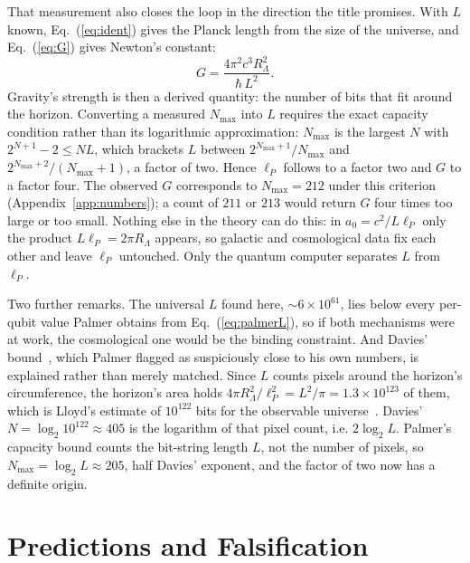 \documentclass[aps,prd,twocolumn,superscriptaddress,nofootinbib,showkeys]{revtex4-2}
\begin{document}
That measurement also closes the loop in the direction the title promises. With $L$ known, Eq.~(\ref{eq:ident}) gives the Planck length from the size of the universe, and Eq.~(\ref{eq:G}) gives Newton's constant:
\begin{equation}
G = \frac{4\pi^2 c^3 R_\Lambda^2}{\hbar\,L^2}.
\label{eq:Gchain}
\end{equation}
Gravity's strength is then a derived quantity: the number of bits that fit around the horizon. Converting a measured $N_{\max}$ into $L$ requires the exact capacity condition rather than its logarithmic approximation: $N_{\max}$ is the largest $N$ with $2^{N+1}-2\le NL$, which brackets $L$ between $2^{N_{\max}+1}/N_{\max}$ and $2^{N_{\max}+2}/(N_{\max}+1)$, a factor of two. Hence $\ell_P$ follows to a factor two and $G$ to a factor four. The observed $G$ corresponds to $N_{\max}=212$ under this criterion (Appendix~\ref{app:numbers}); a count of $211$ or $213$ would return $G$ four times too large or too small. Nothing else in the theory can do this: in $a_0 = c^2/L\ell_P$ only the product $L\ell_P = 2\pi R_\Lambda$ appears, so galactic and cosmological data fix each other and leave $\ell_P$ untouched. Only the quantum computer separates $L$ from $\ell_P$.

Two further remarks. The universal $L$ found here, $\sim6\times10^{61}$, lies below every per-qubit value Palmer obtains from Eq.~(\ref{eq:palmerL}), so if both mechanisms were at work, the cosmological one would be the binding constraint. And Davies' bound~\cite{davies2007}, which Palmer flagged as suspiciously close to his own numbers, is explained rather than merely matched. Since $L$ counts pixels around the horizon's circumference, the horizon's area holds $4\pi R_\Lambda^2/\ell_P^2 = L^2/\pi = 1.3\times10^{123}$ of them, which is Lloyd's estimate of $10^{122}$ bits for the observable universe~\cite{lloyd2002}. Davies' $N = \log_2 10^{122}\approx405$ is the logarithm of that pixel count, i.e. $2\log_2L$. Palmer's capacity bound counts the bit-string length $L$, not the number of pixels, so $N_{\max} = \log_2 L\approx205$, half Davies' exponent, and the factor of two now has a definite origin.

\section{Predictions and Falsification}
\label{sec:predictions}
\end{document}
